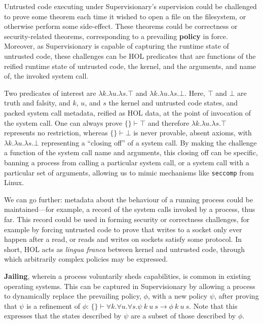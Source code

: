 \documentclass[sigplan, review]{acmart}
\newcommand{\deffont}[1]{\textbf{#1}}
\newcommand{\fall}[1]{\forall{#1}.}
\newcommand{\lam}[1]{\lambda{#1}.}
\begin{document}
Untrusted code executing under Supervisionary's supervision could be challenged to prove some theorem each time it wished to open a file on the filesystem, or otherwise perform some side-effect.
These theorems could be correctness or security-related theorems, corresponding to a prevailing \deffont{policy} in force.
Moreover, as Supervisionary is capable of capturing the runtime state of untrusted code, these challenges can be HOL predicates that are functions of the reified runtime state of untrusted code, the kernel, and the arguments, and name of, the invoked system call.

Two predicates of interest are $\lam{k}\lam{u}\lam{s}\top$ and $\lam{k}\lam{u}\lam{s}\bot$.
Here, $\top$ and $\bot$ are truth and falsity, and $k$, $u$, and $s$ the kernel and untrusted code states, and packed system call metadata, reified as HOL data, at the point of invocation of the system call.
One can always prove $\{\} \vdash \top$ and therefore $\lam{k}\lam{u}\lam{s}\top$ represents no restriction, whereas $\{ \} \vdash \bot$ is never provable, absent axioms, with $\lam{k}\lam{u}\lam{s}\bot$ representing a ``closing off'' of a system call.
By making the challenge a function of the system call name and arguments, this closing off can be specific, banning a process from calling a particular system call, or a system call with a particular set of arguments, allowing us to mimic mechanisms like \texttt{seccomp} from Linux.

We can go further: metadata about the behaviour of a running process could be maintained---for example, a record of the system calls invoked by a process, thus far.
This record could be used in forming security or correctness challenges, for example by forcing untrusted code to prove that writes to a socket only ever happen after a read, or reads and writes on sockets satisfy some protocol.
In short, HOL acts as \emph{lingua franca} between kernel and untrusted code, through which arbitrarily complex policies may be expressed.

\deffont{Jailing}, wherein a process voluntarily sheds capabilities, is common in existing operating systems.
This can be captured in Supervisionary by allowing a process to dynamically replace the prevailing policy, $\phi$, with a new policy $\psi$, after proving that $\psi$ is a refinement of $\phi$: $\{\} \vdash \fall{k}\fall{u}\fall{s} \psi\ k\ u\ s \longrightarrow \phi\ k\ u\ s$.
Note that this expresses that the states described by $\psi$ are a subset of those described by $\phi$.
\end{document}

